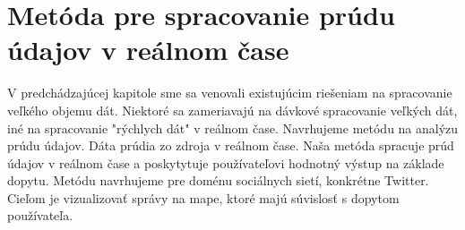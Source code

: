 \chapter{Metóda pre spracovanie prúdu údajov v reálnom čase}
\label{Method for data stream analysis in real-time} 
V predchádzajúcej kapitole sme sa venovali existujúcim riešeniam na spracovanie veľkého objemu dát. Niektoré sa zameriavajú na dávkové spracovanie veľkých dát, iné na spracovanie "rýchlych dát" v reálnom čase.
Navrhujeme metódu na analýzu prúdu údajov. Dáta prúdia zo zdroja v reálnom čase. Naša metóda spracuje prúd údajov v reálnom čase a poskytytuje používateľovi hodnotný výstup na základe dopytu. Metódu navrhujeme pre doménu sociálnych sietí, konkrétne Twitter. Cieľom je vizualizovať správy na mape, ktoré majú súvislosť s dopytom používateľa.

%
